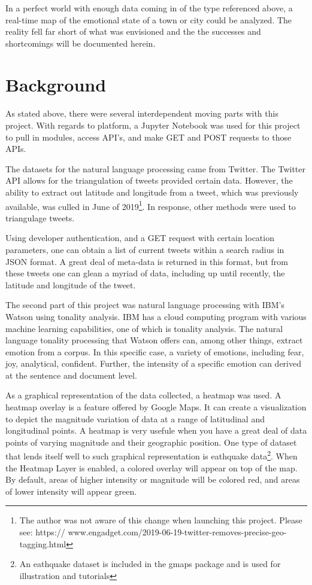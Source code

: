 \documentclass[12pt, oneside]{article}
\begin{document}
In a perfect world with enough data coming in of the type referenced above, a
real-time map of the emotional state of a town or city could be analyzed. The
reality fell far short of what was envisioned and the the successes and
shortcomings will be documented herein.


\section{Background}
\paragraph{}
As stated above, there were several interdependent moving parts with this
project. With regards to platform, a Jupyter Notebook was used for this
project to pull in modules, access API's, and make GET and POST requests to
those APIs.

The datasets for the natural language processing came from Twitter. The
Twitter API allows for the triangulation of tweets provided certain
data\cite{TwitterGeo}.
However, the ability to extract out latitude and longitude from a tweet, which
was previously available, was culled in June of 2019\footnote{The author was not
aware of this change when launching this project. Please see: https://
www.engadget.com/2019-06-19-twitter-removes-precise-geo-tagging.html}. In
response, other methods were used to triangulage tweets.

Using developer authentication, and a GET request with certain location
parameters, one can obtain a list of current tweets within a search radius in
JSON format. A great deal of meta-data is returned in this format, but from
these tweets one can glean a myriad of data, including up until recently, the
latitude and longitude of the tweet.

The second part of this project was natural language processing with IBM's
Watson using tonality analysis.
IBM has a cloud computing program with various machine learning
capabilities\cite{IBM}, one of which is tonality analysis. The natural language
tonality processing that Watson offers can, among other things, extract emotion
from a corpus. In this specific case, a variety of emotions, including
fear, joy, analytical, confident. Further, the intensity of a
specific emotion can derived at the sentence and document level.

As a graphical representation of the data collected, a heatmap was used. A
heatmap overlay is a feature offered by Google Maps. It can create a
visualization to depict the magnitude variation of data at a range of
latitudinal and longitudinal points.
A heatmap is very usefule when you have a great deal of data points of varying
magnitude and their geographic position. One type of dataset that lends itself
well to such graphical representation is eathquake data\footnote{An eathquake
dataset is included in the gmaps package and is used for illustration and
tutorials}.
When the Heatmap Layer is enabled, a colored overlay will appear on top of the
map. By default, areas of higher intensity or magnitude will be colored red,
and areas of lower intensity will appear green\cite{Google}.
\end{document}
